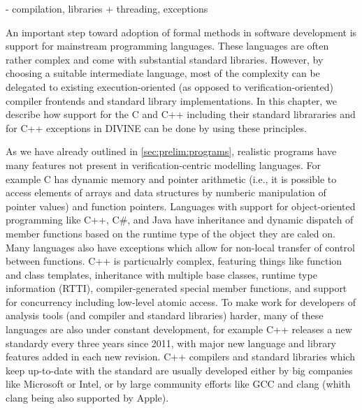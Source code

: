 
- compilation, libraries + threading, exceptions

\bigskip

An important step toward adoption of formal methods in software development is
support for mainstream programming languages.
These languages are often rather complex and come with substantial standard
libraries.
However, by choosing a suitable intermediate language, most of the complexity
can be delegated to existing execution-oriented (as opposed to
verification-oriented) compiler frontends and standard library implementations.
In this chapter, we describe how support for the C and C++ including their
standard librararies and for C++ exceptions in DIVINE can be done by using
these principles.


As we have already outlined in \autoref{sec:prelim:programs}, realistic
programs have many features not present in verification-centric modelling
languages.
For example C has dynamic memory and pointer arithmetic (i.e., it is possible
to access elements of arrays and data structures by numberic manipulation of
pointer values) and function pointers.
Languages with support for object-oriented programming like C++, C\#, and Java
have inheritance and dynamic dispatch of member functions based on the runtime
type of the object they are caled on.
Many languages also have exceptions which allow for non-local transfer of
control between functions.
C++ is particualrly complex, featuring things like function and class
templates,
inheritance with multiple base classes, runtime type information (RTTI),
compiler-generated special member functions,
and support for concurrency including low-level atomic access.
To make work for developers of analysis tools (and compiler and standard
libraries) harder, many of these languages are also under constant development,
for example C++ releases a new standardy every three years since 2011, with
major new language and library features added in each new revision.
C++ compilers and standard libraries which keep up-to-date with the standard
are usually developed either by big companies like Microsoft or Intel, or by
large community efforts like GCC and clang (whith clang being also supported by
Apple).

